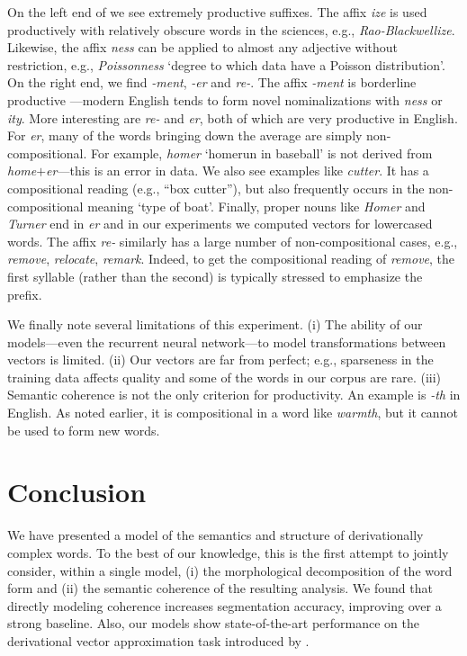 \documentclass[11pt,letterpaper]{article}
\newcommand{\word}[1]{{\em #1}}
\begin{document}
On the left end of  we see extremely productive
suffixes. The affix \word{ize} is used productively with relatively
obscure words in the sciences, e.g., \word{Rao-Blackwellize}.
Likewise, the affix \word{ness} can be applied to almost any adjective
without restriction, e.g., \word{Poissonness} `degree to which data
have a Poisson distribution'.  On the right end, we find \word{-ment},
\word{-er} and \word{re-}.  The affix \word{-ment} is borderline
productive \cite{bauer1983english}---modern English tends to form
novel nominalizations with \word{ness} or \word{ity}. More interesting
are \word{re-} and \mbox{\word{er}}, both of which are very
productive in English. For \word{er}, many of the words
bringing down the average are simply non-compositional. For
example, \word{homer} `homerun in baseball' is not derived
from \word{home}$+$\word{er}---this is an error in data. We
also see examples like \word{cutter}. It has a 
compositional reading (e.g., ``box cutter''), but also
frequently occurs in the non-compositional meaning `type of
boat'.  Finally, proper nouns like \word{Homer} and
\word{Turner} end in \word{er} and in our experiments we
computed vectors for lowercased words.  The affix \word{re-}
similarly has a large number of non-compositional cases,
e.g., \word{remove}, \word{relocate}, \word{remark}. Indeed,
to get the compositional reading of \word{remove}, the first
syllable (rather than the second) is typically stressed to
emphasize the prefix.

We finally note several limitations of this experiment. (i)
The ability of our models---even the recurrent neural network---to model
transformations between vectors is limited. 
(ii) Our vectors are far from perfect;  e.g., sparseness in the training data affects quality
and some of the words in our corpus are rare.
(iii)
Semantic coherence is not the only
criterion for productivity. 
An example is \word{-th} in English. As noted earlier, it is
compositional in a word like \word{warmth},
but it cannot be used to form new
words.


\section{Conclusion}
We have presented a model of the semantics and structure of
derivationally complex words. To the best of our knowledge,
this is the first attempt to jointly consider, within a
single model, (i) the morphological decomposition of the word form and
(ii) the semantic coherence of the resulting analysis. We
found that directly modeling coherence increases
segmentation accuracy, improving over a strong
baseline. Also, our models show state-of-the-art
performance on the derivational vector approximation task
introduced by .
\end{document}
